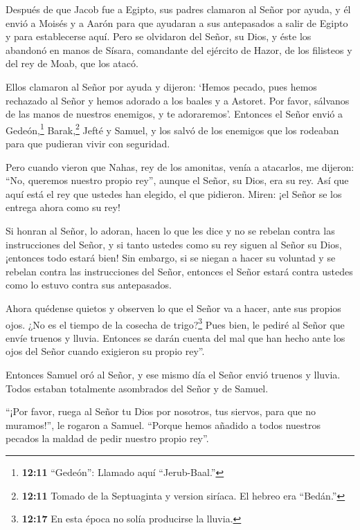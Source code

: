  Después de que Jacob fue a Egipto, sus padres clamaron al
Señor por ayuda, y él envió a Moisés y a Aarón para que ayudaran a sus
antepasados a salir de Egipto y para establecerse aquí. 
Pero se olvidaron del Señor, su Dios, y éste los abandonó en manos de
Sísara, comandante del ejército de Hazor, de los filisteos y del rey de
Moab, que los atacó.

 Ellos clamaron al Señor por ayuda y dijeron: `Hemos
pecado, pues hemos rechazado al Señor y hemos adorado a los baales y a
Astoret. Por favor, sálvanos de las manos de nuestros enemigos, y te
adoraremos'.  Entonces el Señor envió a Gedeón,\footnote{\textbf{12:11}
  ``Gedeón'': Llamado aquí ``Jerub-Baal.''} Barak,\footnote{\textbf{12:11}
  Tomado de la Septuaginta y version siríaca. El hebreo era ``Bedán.''}
Jefté y Samuel, y los salvó de los enemigos que los rodeaban para que
pudieran vivir con seguridad.

 Pero cuando vieron que Nahas, rey de los amonitas, venía a
atacarlos, me dijeron: ``No, queremos nuestro propio rey'', aunque el
Señor, su Dios, era su rey.  Así que aquí está el rey que
ustedes han elegido, el que pidieron. Miren: ¡el Señor se los entrega
ahora como su rey!

 Si honran al Señor, lo adoran, hacen lo que les dice y no
se rebelan contra las instrucciones del Señor, y si tanto ustedes como
su rey siguen al Señor su Dios, ¡entonces todo estará bien!
 Sin embargo, si se niegan a hacer su voluntad y se rebelan
contra las instrucciones del Señor, entonces el Señor estará contra
ustedes como lo estuvo contra sus antepasados.

 Ahora quédense quietos y observen lo que el Señor va a
hacer, ante sus propios ojos.  ¿No es el tiempo de la
cosecha de trigo?\footnote{\textbf{12:17} En esta época no solía
  producirse la lluvia.} Pues bien, le pediré al Señor que envíe truenos
y lluvia. Entonces se darán cuenta del mal que han hecho ante los ojos
del Señor cuando exigieron su propio rey''.

 Entonces Samuel oró al Señor, y ese mismo día el Señor
envió truenos y lluvia. Todos estaban totalmente asombrados del Señor y
de Samuel.

 ``¡Por favor, ruega al Señor tu Dios por nosotros, tus
siervos, para que no muramos!'', le rogaron a Samuel. ``Porque hemos
añadido a todos nuestros pecados la maldad de pedir nuestro propio
rey''.

